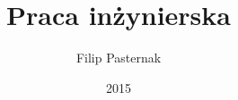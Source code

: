 \documentclass[11pt]{aghdpl}
\author{Filip Pasternak}
\title{Praca inżynierska}
\date{2015}
\begin{document}
\titlepages

{
	\fancyhf{}
	\renewcommand{\headrulewidth}{0pt}
	\renewcommand{\footrulewidth}{0pt}
}

\tableofcontents
\clearpage

\newpage









% 


\end{document}
